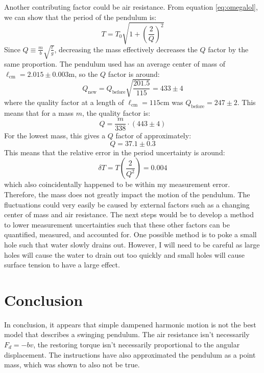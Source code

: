 \documentclass[%
 reprint,
 amsmath,amssymb
 aps,
]{revtex4-2}
\begin{document}
Another contributing factor could be air resistance. From equation \ref{eq:omegalol}, we can show that the period of the pendulum is:
\begin{equation}
    T = T_0\sqrt{1+\left(\frac{2}{Q}\right)^2}
    \label{eq:}
\end{equation}
Since $Q \equiv \frac{m}{b}\sqrt{\frac{\ell}{g}}$, decreasing the mass effectively decreases the $Q$ factor by the same proportion. The pendulum used has an average center of mass of $\ell_\text{cm}=2.015 \pm 0.003 \si{\meter}$, so the $Q$ factor is around:
\begin{equation}
    Q_\text{new} = Q_\text{before}\sqrt{\frac{201.5}{115}} = 433 \pm 4
    \label{eq:}
\end{equation}
where the quality factor at a length of $\ell_\text{cm}=115\si{\centi\meter}$ was $Q_\text{before}=247 \pm 2$. This means that for a mass $m$, the quality factor is:
\begin{equation}
    Q = \frac{m}{338} \cdot \left(443 \pm 4\right)
    \label{eq:}
\end{equation}
For the lowest mass, this gives a $Q$ factor of approximately:
\begin{equation}
    Q = 37.1 \pm 0.3
    \label{eq:}
\end{equation}
This means that the relative error in the period uncertainty is around:
\begin{equation}
    \delta T = T\left(\frac{2}{Q^2}\right) = 0.004
    \label{eq:}
\end{equation}
which also coincidentally happened to be within my measurement error. Therefore, the mass does not greatly impact the motion of the pendulum. The fluctuations could very easily be caused by external factors such as a changing center of mass and air resistance. The next steps would be to develop a method to lower measurement uncertainties such that these other factors can be quantified, measured, and accounted for. One possible method is to poke a small hole such that water slowly drains out. However, I will need to be careful as large holes will cause the water to drain out too quickly and small holes will cause surface tension to have a large effect.
\section{Conclusion}
In conclusion, it appears that simple dampened harmonic motion is not the best model that describes a swinging pendulum. The air resistance isn't necessarily $F_d = -bv$, the restoring torque isn't necessarily proportional to the angular displacement. The instructions have also approximated the pendulum as a point mass, which was shown to also not be true.
\end{document}
